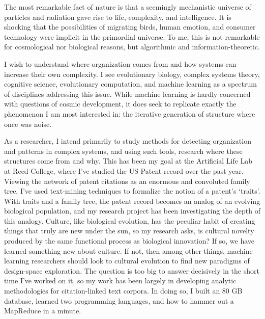 
The most remarkable fact of nature is that a seemingly mechanistic universe of particles and radiation gave rise to life, complexity, and intelligence. It is shocking that the possibilities of migrating birds, human emotion, and consumer technology were implicit in the primordial universe. To me, this is not remarkable for cosmological nor biological reasons, but algorithmic and information-theoretic.

I wish to understand where organization comes from and how systems can increase their own complexity. I see evolutionary biology, complex systems theory, cognitive science, evolutionary computation, and machine learning as a spectrum of disciplines addressing this issue. While machine learning is hardly concerned with questions of cosmic development, it does seek to replicate exactly the phenomenon I am most interested in: the iterative generation of structure where once was noise.

As a researcher, I intend primarily to study methods for detecting organization and patterns in complex systems, and using such tools, research where these structures come from and why. This has been my goal at the Artificial Life Lab at Reed College, where I've studied the US Patent  record over the past year. Viewing the network of patent citations as an enormous and convoluted family tree, I've used  text-mining techniques to formalize the notion of a patent's `traits'. With  traits and a family tree, the patent record becomes an analog of an evolving biological population, and my research project has been investigating the depth of this analogy. Culture, like biological evolution, has the peculiar habit of creating things that truly are new under the sun, so my research asks, is cultural novelty produced by the same functional process as biological innovation? If so, we have learned something new about culture. If not, then among other things, machine learning researchers should look to cultural evolution to find new paradigms of design-space exploration. The question is too big to answer decisively in the short time I've worked on it, so my work has been largely in developing analytic methodologies for citation-linked text corpora. In doing so, I built an 80 GB database, learned two programming languages, and how to hammer out a MapReduce in a minute. 

